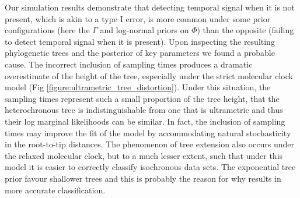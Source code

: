 \documentclass[10pt,letterpaper]{article}
\begin{document}
Our simulation results demonstrate that detecting temporal signal when it is not present, which is akin to a type I error, is more common under some prior configurations (here the $\Gamma$ and log-normal priors on $\Phi$) than the opposite (failing to detect temporal signal when it is present). Upon inspecting the resulting phylogenetic trees and the posterior of key parameters we found a probable cause. The incorrect inclusion of sampling times produces a dramatic overestimate of the height of the tree, especially under the strict molecular clock model (Fig \ref{figure:ultrametric_tree_distortion}). Under this situation, the sampling times represent such a small proportion of the tree height, that the heterochronous tree is indistinguishable from one that is ultrametric and thus their log marginal likelihoods can be similar. In fact, the inclusion of sampling times may improve the fit of the model by accommodating natural stochasticity in the root-to-tip distances. The phenomenon of tree extension also occurs under the relaxed molecular clock, but to a much lesser extent, such that under this model it is easier to correctly classify isochronous data sets. The exponential tree prior favour shallower trees and this is probably the reason for why results in more accurate classification.
\end{document}
